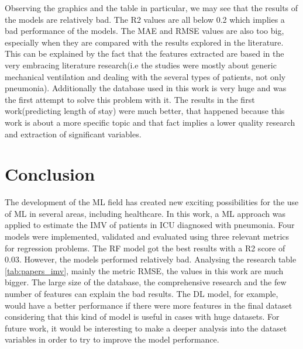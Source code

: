 \documentclass[journal]{IEEEtran} %
\begin{document}
Observing the graphics and the table in particular, we may see that the results of the models are relatively bad. The R2 values are all below 0.2 which implies a bad performance of the models. The MAE and RMSE values are also too big, especially when they are compared with the results explored in the literature. This can be explained by the fact that the features extracted are based in the very embracing
 literature research(i.e the studies were mostly about generic mechanical ventilation and dealing with the several types of patients, not only pneumonia). Additionally the database used in this work is very huge and was the first attempt to solve this problem with it. The results in the first work(predicting length of stay) were much better, that happened because this work is about a more specific topic and that fact implies a lower quality research and extraction of significant variables.

\section{Conclusion}
The development of the ML field has created new exciting possibilities for the use of ML in several areas, including healthcare. In this work, a ML approach was applied to estimate the IMV of patients in ICU diagnosed with pneumonia. Four models were implemented, validated and evaluated using three relevant metrics for regression problems. The RF model got the best results with a R2 score of 0.03. However, the models performed  relatively bad. Analysing the research table \ref{tab:papers_imv}, mainly the metric RMSE, the values in this work are much bigger. 
The large size of the database, the comprehensive research and the few number of features can explain the bad results. The DL model, for example, would have a better performance if there were more features in the final dataset considering that this kind of model is useful in cases with huge datasets.
For future work, it would be interesting to make a deeper analysis into the dataset variables in order to try to improve the model performance.

  
  
\end{document}
